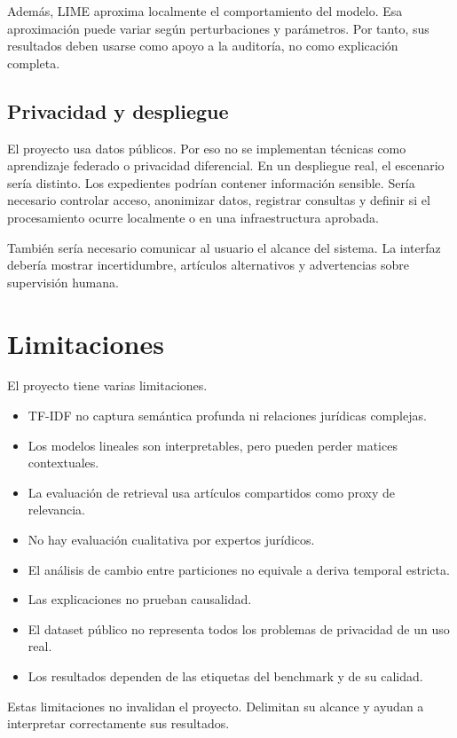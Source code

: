 \documentclass[11pt,a4paper]{article}
\begin{document}
Además, LIME aproxima localmente el comportamiento del modelo. Esa aproximación puede variar según perturbaciones y parámetros. Por tanto, sus resultados deben usarse como apoyo a la auditoría, no como explicación completa.

\subsection{Privacidad y despliegue}

El proyecto usa datos públicos. Por eso no se implementan técnicas como aprendizaje federado o privacidad diferencial. En un despliegue real, el escenario sería distinto. Los expedientes podrían contener información sensible. Sería necesario controlar acceso, anonimizar datos, registrar consultas y definir si el procesamiento ocurre localmente o en una infraestructura aprobada.

También sería necesario comunicar al usuario el alcance del sistema. La interfaz debería mostrar incertidumbre, artículos alternativos y advertencias sobre supervisión humana.

\section{Limitaciones}
\label{sec_limitaciones}

El proyecto tiene varias limitaciones.

\begin{itemize}
    \item TF-IDF no captura semántica profunda ni relaciones jurídicas complejas.
    \item Los modelos lineales son interpretables, pero pueden perder matices contextuales.
    \item La evaluación de retrieval usa artículos compartidos como proxy de relevancia.
    \item No hay evaluación cualitativa por expertos jurídicos.
    \item El análisis de cambio entre particiones no equivale a deriva temporal estricta.
    \item Las explicaciones no prueban causalidad.
    \item El dataset público no representa todos los problemas de privacidad de un uso real.
    \item Los resultados dependen de las etiquetas del benchmark y de su calidad.
\end{itemize}

Estas limitaciones no invalidan el proyecto. Delimitan su alcance y ayudan a interpretar correctamente sus resultados.
\end{document}

